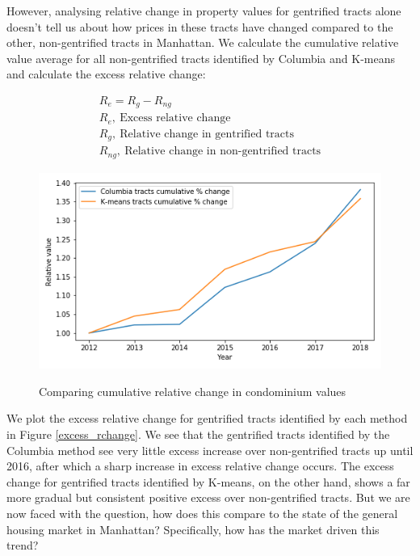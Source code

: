 However, analysing relative change in property values for gentrified tracts alone doesn't tell us about how prices in these tracts have changed compared to the other, non-gentrified tracts in Manhattan. We calculate the cumulative relative value average for all non-gentrified tracts identified by Columbia and K-means and calculate the excess relative change:

\begin{align}
    R_e = R_g - R_{ng} \\
    R_e,\ \text{Excess relative change} \nonumber \\
    R_g,\ \text{Relative change in gentrified tracts} \nonumber \\
    R_{ng},\ \text{Relative change in non-gentrified tracts} \nonumber
\end{align}

\begin{figure}[h]
    \centering
    \scalebox{0.5}  
    {\includegraphics{figs/comparing_rv_in_g_tracts.png}}
    \caption{Comparing cumulative relative change in condominium values}
    \label{comparing_cum_perc_change_value}
\end{figure}

We plot the excess relative change for gentrified tracts identified by each method in Figure \ref{excess_rchange}. We see that the gentrified tracts identified by the Columbia method see very little excess increase over  
non-gentrified tracts up until 2016, after which a sharp increase in excess relative change occurs. The excess change for gentrified tracts identified by K-means, on the other hand, shows a far more gradual but consistent positive excess over non-gentrified tracts. But we are now faced with the question, how does this compare to the state of the general housing market in Manhattan? Specifically, how has the market driven this trend?

